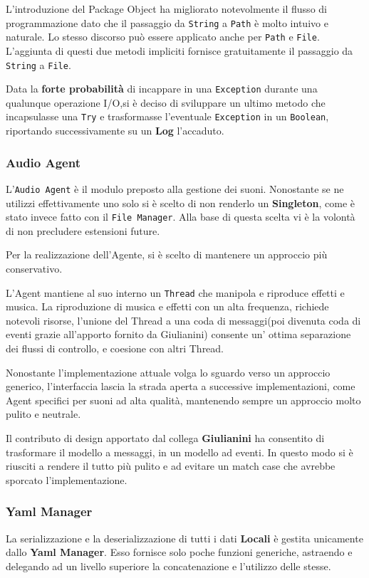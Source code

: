     L'introduzione del Package Object ha migliorato notevolmente il flusso di programmazione dato che il passaggio da \texttt{String} a \texttt{Path} è molto intuivo e naturale. Lo stesso discorso può essere applicato anche per \texttt{Path} e \texttt{File}.
    L'aggiunta di questi due metodi impliciti fornisce gratuitamente il passaggio da \texttt{String} a \texttt{File}.
        
     Data la \textbf{forte probabilità} di incappare in una \texttt{Exception} durante una qualunque operazione I/O,si è deciso di sviluppare un ultimo metodo che incapsulasse una \texttt{Try} e trasformasse l'eventuale  \texttt{Exception} in un \texttt{Boolean}, riportando successivamente su un \textbf{Log} l'accaduto.
    
    \subsubsection{Audio Agent}
    L'\texttt{Audio Agent} è il modulo preposto alla gestione dei suoni. Nonostante se ne utilizzi effettivamente uno solo si è scelto di non renderlo un \textbf{Singleton}, come è stato invece fatto con il \texttt{File Manager}. 
    Alla base di questa scelta vi è la volontà di non precludere estensioni future.
    
    Per la realizzazione dell'Agente, si è scelto di mantenere un approccio più conservativo. 
    
    L'Agent mantiene al suo interno un \texttt{Thread} che 
    manipola e riproduce effetti e musica.
    La riproduzione di musica e effetti con un alta frequenza, richiede notevoli risorse, l'unione del Thread a una coda di messaggi(poi divenuta coda di eventi grazie all'apporto fornito da Giulianini) consente un' ottima separazione dei flussi di controllo, e coesione con altri Thread.
    
    Nonostante l'implementazione attuale volga lo sguardo verso un approccio generico, l'interfaccia lascia la strada aperta a successive implementazioni, come Agent specifici per suoni ad alta qualità, mantenendo sempre un approccio molto pulito e neutrale.
    
    Il contributo di design apportato dal collega \textbf{Giulianini} ha consentito di trasformare il modello a messaggi, in un modello ad eventi. In questo modo si è riusciti a rendere il tutto più
    pulito e ad evitare un match case
    che avrebbe sporcato l'implementazione.
    
    \subsubsection{Yaml Manager}
    La serializzazione e la deserializzazione di tutti i dati \textbf{Locali} è gestita unicamente dallo \textbf{Yaml Manager}. Esso fornisce solo poche funzioni generiche, astraendo e delegando ad un livello superiore 
    la concatenazione e l'utilizzo delle stesse.
    
